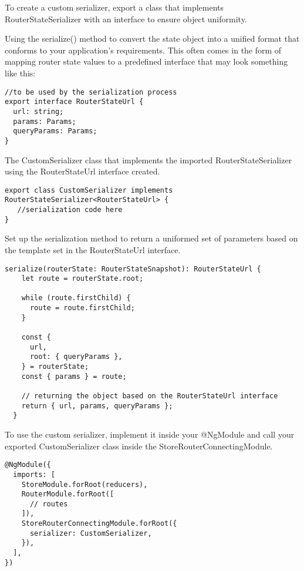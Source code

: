 To create a custom serializer, export a class that implements
RouterStateSerializer with an interface to ensure object uniformity.

Using the serialize() method to convert the state object into a unified format
that conforms to your application’s requirements. This often comes in the form
of mapping router state values to a predefined interface that may look something
like this:

\begin{lstlisting}
//to be used by the serialization process
export interface RouterStateUrl {
  url: string;
  params: Params;
  queryParams: Params;
}
\end{lstlisting}

The CustomSerializer class that implements the imported RouterStateSerializer
using the RouterStateUrl interface created.

\begin{lstlisting}
export class CustomSerializer implements RouterStateSerializer<RouterStateUrl> {
   //serialization code here
}
\end{lstlisting}

Set up the serialization method to return a uniformed set of parameters based
on the template set in the RouterStateUrl interface.

\begin{lstlisting}
serialize(routerState: RouterStateSnapshot): RouterStateUrl {
    let route = routerState.root;

    while (route.firstChild) {
      route = route.firstChild;
    }

    const {
      url,
      root: { queryParams },
    } = routerState;
    const { params } = route;

    // returning the object based on the RouterStateUrl interface
    return { url, params, queryParams };
  }

\end{lstlisting}

To use the custom serializer, implement it inside your @NgModule and call your
exported CustomSerializer class inside the StoreRouterConnectingModule.

\begin{lstlisting}
@NgModule({
  imports: [
    StoreModule.forRoot(reducers),
    RouterModule.forRoot([
      // routes
    ]),
    StoreRouterConnectingModule.forRoot({
      serializer: CustomSerializer,
    }),
  ],
})
\end{lstlisting}

